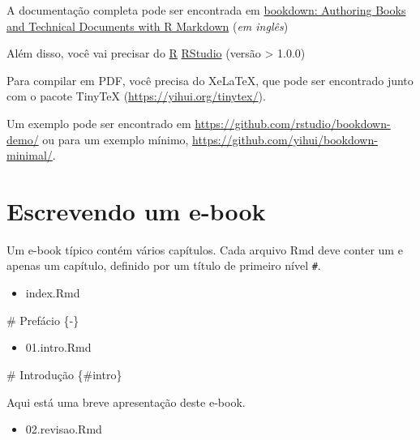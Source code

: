\documentclass[
]{book}
\newenvironment{Shaded}{\begin{snugshade}}{\end{snugshade}}
\newcommand{\FunctionTok}[1]{\textcolor[rgb]{0.00,0.00,0.00}{#1}}
\newcommand{\NormalTok}[1]{#1}
\providecommand{\tightlist}{%
  \setlength{\itemsep}{0pt}\setlength{\parskip}{0pt}}
\begin{document}
A documentação completa pode ser encontrada em \href{https://bookdown.org/yihui/bookdown/}{bookdown: Authoring Books and Technical Documents with R Markdown} (\emph{em inglês})

Além disso, você vai precisar do \href{https://cran.r-project.org/}{R} \href{https://www.rstudio.com/products/rstudio/download/}{RStudio} (versão \textgreater{} 1.0.0)

Para compilar em PDF, você precisa do XeLaTeX, que pode ser encontrado junto com o pacote TinyTeX (\url{https://yihui.org/tinytex/}).

Um exemplo pode ser encontrado em \url{https://github.com/rstudio/bookdown-demo/} ou para um exemplo mínimo, \url{https://github.com/yihui/bookdown-minimal/}.

\hypertarget{escrevendo-um-e-book}{%
\section{Escrevendo um e-book}\label{escrevendo-um-e-book}}

Um e-book típico contém vários capítulos. Cada arquivo Rmd deve conter um e apenas um capítulo, definido por um título de primeiro nível \texttt{\#}.

\begin{itemize}
\tightlist
\item
  index.Rmd
\end{itemize}

\begin{Shaded}
\begin{Highlighting}[]
\FunctionTok{\# Prefácio \{{-}\}}
\end{Highlighting}
\end{Shaded}

\begin{itemize}
\tightlist
\item
  01.intro.Rmd
\end{itemize}

\begin{Shaded}
\begin{Highlighting}[]
\FunctionTok{\# Introdução \{\#intro\}}

\NormalTok{Aqui está uma breve apresentação deste e{-}book.}
\end{Highlighting}
\end{Shaded}

\begin{itemize}
\tightlist
\item
  02.revisao.Rmd
\end{itemize}
\end{document}
